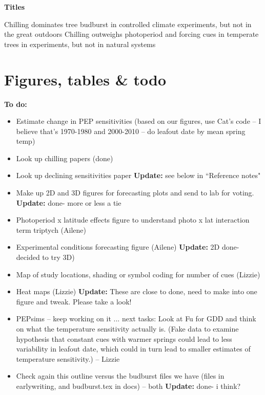 \documentclass[11pt,letter]{article}
\begin{document}
%
 
\renewcommand{\refname}{\CHead{}}


{\bf Titles}

Chilling dominates tree budburst in controlled climate experiments, but not in the great outdoors
Chilling outweighs photoperiod and forcing cues in temperate trees in experiments, but not in natural systems



\section{Figures, tables \& todo}

{\bf To do:}
\begin{itemize}
\item Estimate change in PEP sensitivities (based on our figures, use Cat's code -- I believe that's 1970-1980 and 2000-2010 -- do leafout date by mean spring temp)
\item Look up chilling papers (done)
\item Look up declining sensitivities paper {\bf Update:} see below in ``Reference notes"
\item Make up 2D and 3D figures for forecasting plots and send to lab for voting. {\bf Update:} done- more or less a tie
\item Photoperiod x latitude effects figure to understand photo x lat interaction term  triptych (Ailene)
\item Experimental conditions forecasting figure (Ailene) {\bf Update:}  2D done- decided to try 3D)
\item Map of study locations, shading or symbol coding for number of cues (Lizzie)
\item Heat maps (Lizzie) {\bf Update:} These are close to done, need to make into one figure and tweak. Please take a look!
\item PEPsims -- keep working on it ... next tasks: Look at Fu for GDD and think on what the temperature sensitivity actually is. (Fake data to examine hypothesis that constant cues with warmer springs could lead to less variability in leafout date, which could in turn lead to smaller estimates of temperature sensitivity.) -- Lizzie
\item Check again this outline versus the budburst files we have (files in earlywriting, and budburst.tex in docs) -- both {\bf Update:} done- i think?
\end{itemize}
\end{document}
